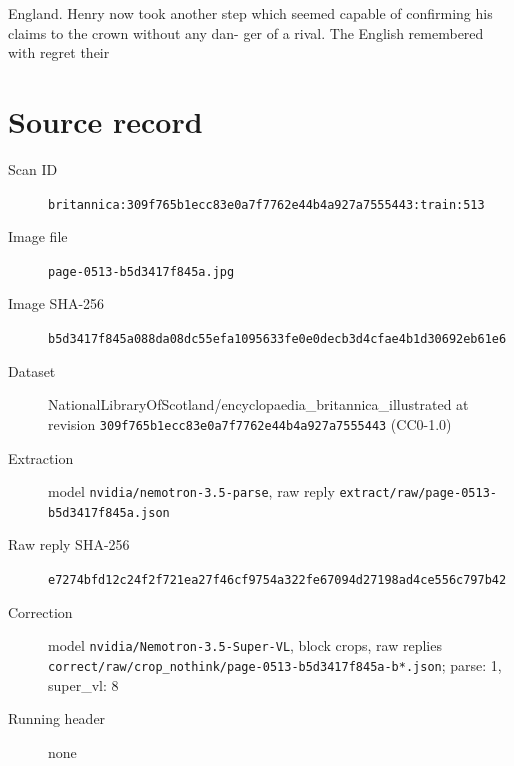\documentclass{article}
\begin{document}
England.
Henry now took another step which seemed capable
of confirming his claims to the crown without any dan-
ger of a rival. The English remembered with regret
their


\section*{Source record}
\begin{description}
\item[Scan ID] \texttt{britannica:309f765b1ecc83e0a7f7762e44b4a927a7555443:train:513}
\item[Image file] \texttt{page-0513-b5d3417f845a.jpg}
\item[Image SHA-256] \texttt{b5d3417f845a088da08dc55efa1095633fe0e0decb3d4cfae4b1d30692eb61e6}
\item[Dataset] NationalLibraryOfScotland/encyclopaedia\_britannica\_illustrated at revision \texttt{309f765b1ecc83e0a7f7762e44b4a927a7555443} (CC0-1.0)
\item[Extraction] model \texttt{nvidia/nemotron-3.5-parse}, raw reply \texttt{extract/raw/page-0513-b5d3417f845a.json}
\item[Raw reply SHA-256] \texttt{e7274bfd12c24f2f721ea27f46cf9754a322fe67094d27198ad4ce556c797b42}
\item[Correction] model \texttt{nvidia/Nemotron-3.5-Super-VL}, block crops, raw replies \texttt{correct/raw/crop\_nothink/page-0513-b5d3417f845a-b*.json}; parse: 1, super\_vl: 8
\item[Running header] none
\end{description}
\end{document}
